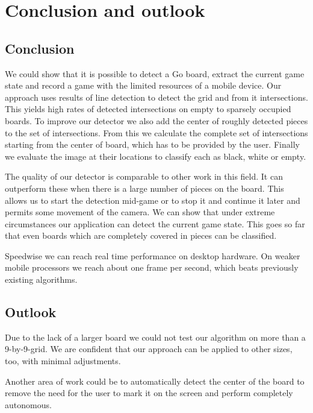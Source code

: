 
\chapter{Conclusion and outlook}
\section{Conclusion}
We could show that it is possible to detect a Go board, extract the current game state and record a game with the limited resources of a mobile device. Our approach uses results of line detection to detect the grid and from it intersections. This yields high rates of detected intersections on empty to sparsely occupied boards. To improve our detector we also add the center of roughly detected pieces to the set of intersections. From this we calculate the complete set of intersections starting from the center of board, which has to be provided by the user. Finally we evaluate the image at their locations to classify each as black, white or empty.

The quality of our detector is comparable to other work in this field. It can outperform these when there is a large number of pieces on the board. This allows us to start the detection mid-game or to stop it and continue it later and permits some movement of the camera. We can show that under extreme circumstances our application can detect the current game state. This goes so far that even boards which are completely covered in pieces can be classified.

Speedwise we can reach real time performance on desktop hardware. On weaker mobile processors we reach about one frame per second, which beats previously existing algorithms.

\section{Outlook}
Due to the lack of a larger board we could not test our algorithm on more than a 9-by-9-grid. We are confident that our approach can be applied to other sizes, too, with minimal adjustments. 

Another area of work could be to automatically detect the center of the board to remove the need for the user to mark it on the screen and perform completely autonomous.
